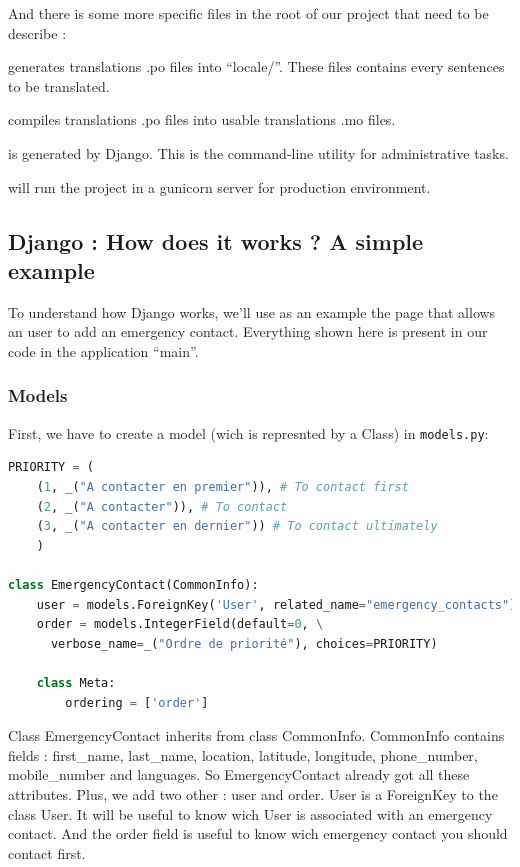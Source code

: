 \documentclass[11pt, a4paper]{article}      %
\begin{document}
And there is some more specific files in the root of our project that need to be describe :
\begin{description}[noitemsep]

\item[- make\_locale.sh] generates translations .po files into ``locale/''. These files contains every sentences to be translated.
\item[- compile\_locale.sh] compiles translations .po files into usable translations .mo files.
\item[- manage.py] is generated by Django. This is the command-line utility for administrative tasks. 
\item[- start.sh] will run the project in a gunicorn server for production environment.
\end{description}

\subsection{Django : How does it works ? A simple example}

To understand how Django works, we'll use as an example the page that allows an user to add an emergency contact. Everything shown here is present in our code in the application ``main''.

\subsubsection{Models}
First, we have to create a model (wich is represnted by a Class) in \texttt{models.py}:

\begin{lstlisting}[language=Python, basicstyle=\footnotesize]
PRIORITY = (
    (1, _("A contacter en premier")), # To contact first
    (2, _("A contacter")), # To contact 
    (3, _("A contacter en dernier")) # To contact ultimately
    )

class EmergencyContact(CommonInfo):
    user = models.ForeignKey('User', related_name="emergency_contacts")
    order = models.IntegerField(default=0, \
      verbose_name=_("Ordre de priorité"), choices=PRIORITY)

    class Meta:
        ordering = ['order']
\end{lstlisting}

Class EmergencyContact inherits from class CommonInfo. CommonInfo contains fields : first\_name, last\_name, location, latitude, longitude, phone\_number, mobile\_number and languages. So EmergencyContact already got all these attributes. Plus, we add two other : user and order. User is a ForeignKey to the class User. It will be useful to know wich User is associated with an emergency contact. And the order field is useful to know wich emergency contact you should contact first.
\end{document}
